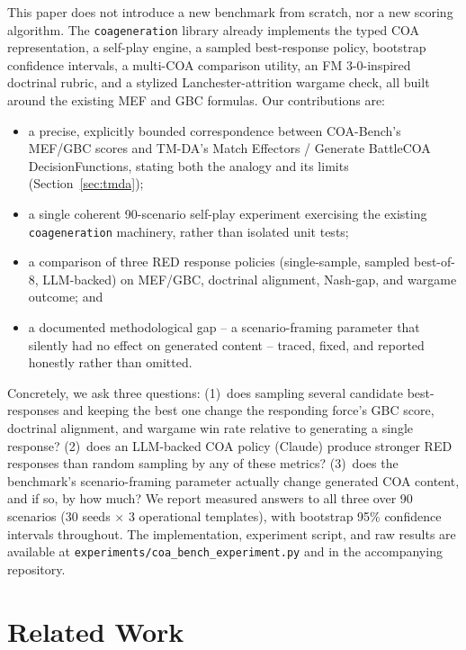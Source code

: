 \documentclass[letterpaper]{article} %
\begin{document}
This paper does not introduce a new benchmark from scratch, nor a new scoring algorithm. The \texttt{coageneration} library already implements the typed COA representation, a self-play engine, a sampled best-response policy, bootstrap confidence intervals, a multi-COA comparison utility, an FM 3-0-inspired doctrinal rubric, and a stylized Lanchester-attrition wargame check, all built around the existing MEF and GBC formulas. Our contributions are:
\begin{itemize}
  \item a precise, explicitly bounded correspondence between COA-Bench's MEF/GBC scores and TM-DA's Match Effectors / Generate BattleCOA DecisionFunctions, stating both the analogy and its limits (Section~\ref{sec:tmda});
  \item a single coherent 90-scenario self-play experiment exercising the existing \texttt{coageneration} machinery, rather than isolated unit tests;
  \item a comparison of three RED response policies (single-sample, sampled best-of-8, LLM-backed) on MEF/GBC, doctrinal alignment, Nash-gap, and wargame outcome; and
  \item a documented methodological gap -- a scenario-framing parameter that silently had no effect on generated content -- traced, fixed, and reported honestly rather than omitted.
\end{itemize}

Concretely, we ask three questions: (1)~does sampling several candidate best-responses and keeping the best one change the responding force's GBC score, doctrinal alignment, and wargame win rate relative to generating a single response? (2)~does an LLM-backed COA policy (Claude) produce stronger RED responses than random sampling by any of these metrics? (3)~does the benchmark's scenario-framing parameter actually change generated COA content, and if so, by how much? We report measured answers to all three over 90 scenarios (30 seeds $\times$ 3 operational templates), with bootstrap 95\% confidence intervals throughout. The implementation, experiment script, and raw results are available at \texttt{experiments/coa\_bench\_experiment.py} and  in the accompanying repository.

\section{Related Work}
\end{document}

